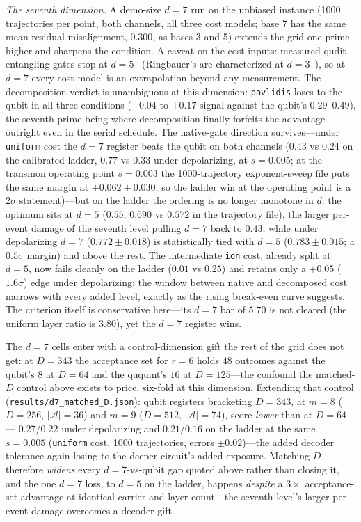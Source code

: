 \documentclass[aps,pra,reprint,superscriptaddress,nofootinbib,floatfix]{revtex4-2}
\begin{document}
\emph{The seventh dimension.} A demo-size $d=7$ run on the unbiased
instance (1000 trajectories per point, both channels, all three cost
models; base 7 has the same mean residual misalignment, $0.300$, as
bases 3 and 5) extends the grid one prime higher and sharpens the
condition. A caveat on the cost inputs: measured qudit entangling
gates stop at $d=5$~\cite{hrmo2023} (Ringbauer's are characterized
at $d=3$~\cite{ringbauer2022}), so at $d=7$ every cost model is an
extrapolation beyond any measurement. The decomposition verdict is
unambiguous at this dimension: \texttt{pavlidis} loses to the qubit in
all three conditions ($-0.04$ to $+0.17$ signal against the qubit's
$0.29$--$0.49$), the seventh prime being where decomposition finally
forfeits the advantage outright even in the serial schedule. The
native-gate direction survives---under \texttt{uniform} cost the $d=7$
register beats the qubit on both channels ($0.43$ vs $0.24$ on the
calibrated ladder, $0.77$ vs $0.33$ under depolarizing, at
$s=0.005$; at the transmon operating point $s=0.003$ the
1000-trajectory exponent-sweep file puts the same margin at
$+0.062\pm0.030$, so the ladder win at the operating point is a
$2\sigma$ statement)---but on the ladder the ordering is no longer
monotone in
$d$: the optimum sits at $d=5$ ($0.55$; $0.690$ vs $0.572$ in the
trajectory file), the larger per-event damage
of the seventh level pulling $d=7$ back to $0.43$, while under
depolarizing $d=7$ ($0.772\pm0.018$) is statistically tied with
$d=5$ ($0.783\pm0.015$; a $0.5\sigma$ margin) and above the rest. The intermediate
\texttt{ion} cost, already split at $d=5$, now fails cleanly on the
ladder ($0.01$ vs $0.25$) and retains only a $+0.05$ ($1.6\sigma$)
edge under depolarizing: the window between native and decomposed cost narrows
with every added level, exactly as the rising break-even curve
suggests. The criterion itself is conservative here---its $d=7$ bar of
$5.70$ is not cleared (the uniform layer ratio is $3.80$), yet the
$d=7$ register wins.

The $d=7$ cells enter with a control-dimension gift the rest of the
grid does not get: at $D=343$ the acceptance set for $r=6$ holds
$48$ outcomes against the qubit's $8$ at $D=64$ and the ququint's
$16$ at $D=125$---the confound the matched-$D$ control above exists
to price, six-fold at this dimension. Extending that control
(\texttt{results/d7\_matched\_D.json}): qubit registers bracketing
$D=343$, at $m=8$ ($D=256$, $|\mathcal A|=36$) and $m=9$ ($D=512$,
$|\mathcal A|=74$), score \emph{lower} than at $D=64$---
$0.27/0.22$ under depolarizing and $0.21/0.16$ on the ladder at the
same $s=0.005$ (\texttt{uniform} cost, 1000 trajectories, errors
$\pm0.02$)---the added decoder tolerance again losing to the deeper
circuit's added exposure. Matching $D$ therefore \emph{widens} every
$d=7$-vs-qubit gap quoted above rather than closing it, and the one
$d=7$ loss, to $d=5$ on the ladder, happens \emph{despite} a
$3\times$ acceptance-set advantage at identical carrier and layer
count---the seventh level's larger per-event damage overcomes a
decoder gift.
\end{document}

